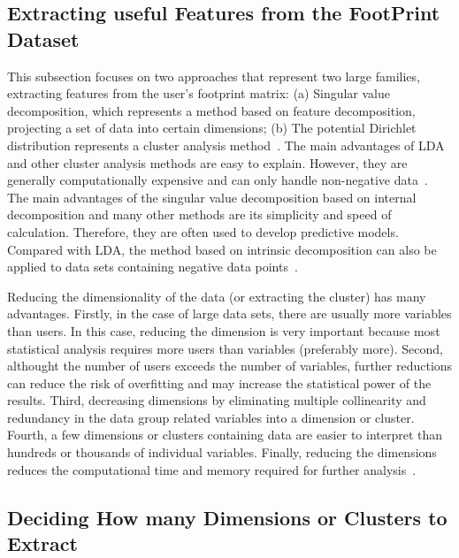\subsection{Extracting useful Features from the FootPrint 
Dataset~\cite{hid515-12}}

This subsection focuses on two approaches that represent two large 
families, extracting features from the user's footprint matrix: 
(a) Singular value decomposition, which represents a method based 
on feature decomposition, projecting a set of data into 
certain dimensions; (b) The potential Dirichlet distribution 
represents a cluster analysis method~\cite{hid515-12}. 
The main advantages of LDA 
and other cluster analysis methods are easy to explain. However, 
they are generally computationally expensive and can only handle 
non-negative data~\cite{hid515-12}. 
The main 
advantages of the singular value decomposition based on internal 
decomposition and many other methods are its simplicity and speed 
of calculation. Therefore, they are often used to develop 
predictive models. Compared with LDA, the method based on 
intrinsic decomposition can also be applied to data sets containing
 negative data points~\cite{hid515-12}.

Reducing the dimensionality of the data (or extracting the cluster)
 has many advantages. 
Firstly, in the case of large data sets, there
 are usually more variables than users. In this case, reducing the
 dimension is very important because most statistical analysis 
requires more users than variables (preferably more). Second, 
althought the number of users exceeds the number of variables, 
further 
reductions can reduce the risk of overfitting and may increase the
 statistical power of the results. Third, decreasing dimensions by 
eliminating multiple collinearity and redundancy in the data group
 related variables into a dimension or cluster. Fourth, a few 
 dimensions or clusters containing data are easier to 
interpret than hundreds or thousands of individual variables. 
Finally, reducing the dimensions reduces the computational time and
 memory required for further analysis~\cite{hid515-12}.

\subsection{Deciding How many Dimensions or Clusters to 
Extract~\cite{hid515-12}}

